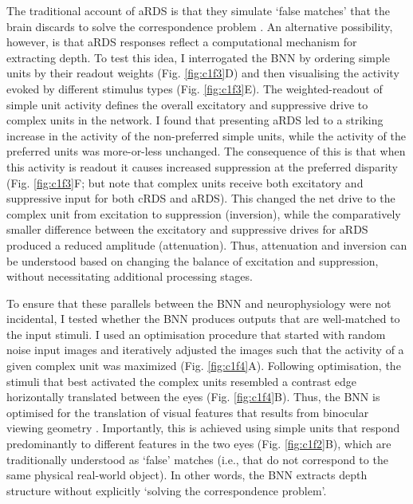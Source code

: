{The traditional account of aRDS is that they simulate `false matches' that the brain discards to solve the correspondence problem \cite{Tanabe:2004mw,Janssen:2003fk}. An alternative possibility, however, is that aRDS responses reflect a computational mechanism for extracting depth. To test this idea, I interrogated the BNN by ordering simple units by their readout weights (Fig. \ref{fig:c1f3}D) and then visualising the activity evoked by different stimulus types (Fig. \ref{fig:c1f3}E). The weighted-readout of simple unit activity defines the overall excitatory and suppressive drive to complex units in the network. I found that presenting aRDS led to a striking increase in the activity of the non-preferred simple units, while the activity of the preferred units was more-or-less unchanged. The consequence of this is that when this activity is readout it causes increased suppression at the preferred disparity (Fig. \ref{fig:c1f3}F; but note that complex units receive both excitatory and suppressive input for both cRDS and aRDS). This changed the net drive to the complex unit from excitation to suppression (inversion), while the comparatively smaller difference between the excitatory and suppressive drives for aRDS produced a reduced amplitude (attenuation). Thus, attenuation and inversion can be understood based on changing the balance of excitation and suppression, without necessitating additional processing stages. 


To ensure that these parallels between the BNN and neurophysiology were not incidental, I tested whether the BNN produces outputs that are well-matched to the input stimuli. I used an optimisation procedure that started with random noise input images and iteratively adjusted the images such that the activity of a given complex unit was maximized (Fig. \ref{fig:c1f4}A). Following optimisation, the stimuli that best activated the complex units resembled a contrast edge horizontally translated between the eyes (Fig. \ref{fig:c1f4}B). Thus, the BNN is optimised for the translation of visual features that results from binocular viewing geometry \cite{Wheatstone:1838xf}. Importantly, this is achieved using simple units that respond predominantly to different features in the two eyes (Fig. \ref{fig:c1f2}B), which are traditionally understood as `false' matches (i.e., that do not correspond to the same physical real-world object). In other words, the BNN extracts depth structure without explicitly `solving the correspondence problem'. 

}

